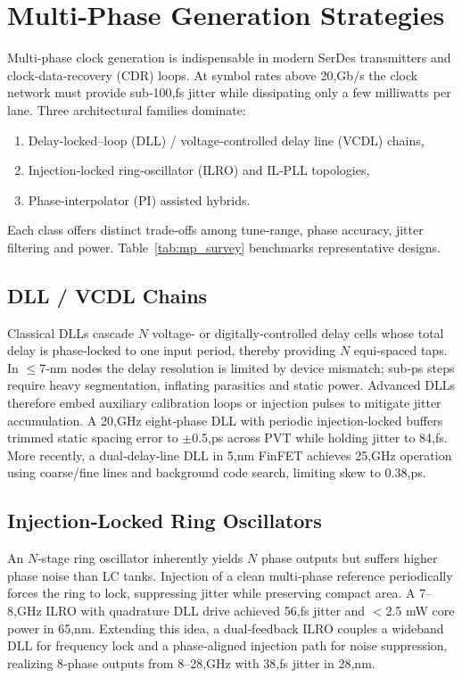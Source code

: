\section{Multi‑Phase Generation Strategies}
Multi‑phase clock generation is indispensable in modern SerDes transmitters and clock‑data‑recovery (CDR) loops.  At symbol rates above 20,Gb/s the clock
network must provide sub‑100,fs jitter while dissipating only a few milliwatts per lane.  Three architectural families dominate:

\begin{enumerate}[label=\arabic*)]
\item Delay‑locked–loop (DLL) / voltage‑controlled delay line (VCDL) chains,
\item Injection‑locked ring‑oscillator (ILRO) and IL‑PLL topologies,
\item Phase‑interpolator (PI) assisted hybrids.
\end{enumerate}
Each class offers distinct trade‑offs among tune‑range, phase accuracy, jitter filtering and power.  Table~\ref{tab:mp_survey} benchmarks representative designs.

\subsection{DLL / VCDL Chains}
Classical DLLs cascade $N$ voltage- or digitally‑controlled delay cells whose total delay is phase‑locked to one input period, thereby providing $N$ equi‑spaced taps\cite{Wang2021JSSC}.  In $\le$7‑nm nodes the delay resolution is limited by device mismatch; sub‑ps steps require heavy segmentation, inflating parasitics and static power.  Advanced DLLs therefore embed auxiliary calibration loops or injection pulses to mitigate jitter accumulation.  A 20,GHz eight‑phase DLL with periodic injection‑locked buffers trimmed static spacing error to $\pm$0.5,ps across PVT while holding jitter to 84,fs\cite{Song2019CICC}.  More recently, a dual‑delay‑line DLL in 5,nm FinFET achieves 25,GHz operation using coarse/fine lines and background code search, limiting skew to 0.38,ps\cite{Chen2020VLSIC}.

\subsection{Injection‑Locked Ring Oscillators}
An $N$‑stage ring oscillator inherently yields $N$ phase outputs but suffers higher phase noise than LC tanks.  Injection of a clean multi‑phase reference periodically forces the ring to lock, suppressing jitter while preserving compact area\cite{Wang2021ISSCC}.  A 7–8,GHz ILRO with quadrature DLL drive achieved 56,fs jitter and $<$2.5 mW core power in 65,nm\cite{Wang2021ISSCC}.  Extending this idea, a dual‑feedback ILRO couples a wideband DLL for frequency lock and a phase‑aligned injection path for noise suppression, realizing 8‑phase outputs from 8–28,GHz with 38,fs jitter in 28,nm\cite{Tian2025ISSCC}.

